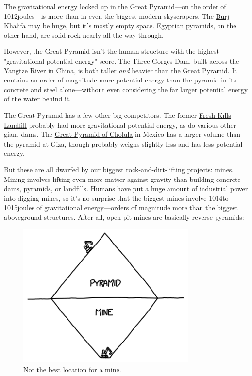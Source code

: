 {{The gravitational energy locked up in the Great Pyramid—on the order of 1012joules—is more than in even the biggest modern skyscrapers. The \href{http://en.wikipedia.org/wiki/Burj\_Khalifa}{Burj Khalifa} may be huge, but it's mostly empty space. Egyptian pyramids, on the other hand, are solid rock nearly all the way through.}

{However, the Great Pyramid isn't the human structure with the highest "gravitational potential energy" score. The Three Gorges Dam, built across the Yangtze River in China, is both taller \emph{and} heavier than the Great Pyramid. It contains an order of magnitude more potential energy than the pyramid in its concrete and steel alone—without even considering the far larger potential energy of the water behind it.}

{The Great Pyramid has a few other big competitors. The former \href{http://en.wikipedia.org/wiki/Fresh\_Kills\_Landfill}{Fresh Kills Landfill} probably had more gravitational potential energy, as do various other giant dams. The \href{http://en.wikipedia.org/wiki/Great\_Pyramid\_of\_Cholula}{Great Pyramid of Cholula} in Mexico has a larger volume than the pyramid at Giza, though probably weighs slightly less and has less potential energy.}

{But these are all dwarfed by our biggest rock-and-dirt-lifting projects: mines. Mining involves lifting even more matter against gravity than building concrete dams, pyramids, or landfills. Humans have put \href{http://www.losapos.com/openpitmines}{a huge amount of industrial power} into digging mines, so it's no surprise that the biggest mines involve 1014to 1015joules of gravitational energy—orders of magnitude more than the biggest aboveground structures. After all, open-pit mines are basically reverse pyramids:}

\begin{figure}[!htbp]
\centering
\includegraphics[scale=0.5, max width=0.8\textwidth]{imgs/a/95/pyramid_mines.png}
\caption{Not the best location for a mine.}
\end{figure}

}
